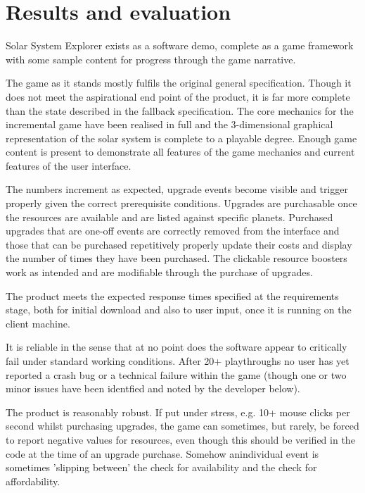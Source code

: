 \documentclass[twoside]{bhamthesis}
\begin{document}
\section{Results and evaluation}

Solar System Explorer exists as a software demo, complete as a game framework with some sample content for progress through the game narrative.



The game as it stands mostly fulfils the original general specification. Though it does not meet the aspirational end point of the product, it is far more complete than the state described in the fallback specification. The core mechanics for the incremental game have been realised in full and the 3-dimensional graphical representation of the solar system is complete to a playable degree. Enough game content is present to demonstrate all features of the game mechanics and current features of the user interface.

The numbers increment as expected, upgrade events become visible and trigger properly given the correct prerequisite conditions. Upgrades are purchasable once the resources are available and are listed against specific planets. Purchased upgrades that are one-off events are correctly removed from the interface and those that can be purchased repetitively properly update their costs and display the number of times they have been purchased. The clickable resource boosters work as intended and are modifiable through the purchase of upgrades.

The product meets the expected response times specified at the requirements stage, both for initial download and also to user input, once it is running on the client machine.

It is reliable in the sense that at no point does the software appear to critically fail under standard working conditions. After 20+ playthroughs no user has yet reported a crash bug or a technical failure within the game (though one or two  minor issues have been identfied and noted by the developer below).

The product is reasonably robust. If put under stress, e.g. 10+ mouse clicks per second whilst purchasing upgrades, the game can sometimes, but rarely, be forced to report negative values for resources, even though this should be verified in the code at the time of an upgrade purchase. Somehow anindividual event is sometimes 'slipping between' the check for availability and the check for affordability.
\end{document}
